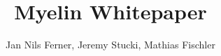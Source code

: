 \documentclass[a4paper]{article}
\title{Myelin Whitepaper}
\author{Jan Nils Ferner, Jeremy Stucki, Mathias Fischler}
\begin{document}
\maketitle
\thispagestyle{empty}

\clearpage

\twocolumn

\begin{abstract}
	
\end{abstract}

\clearpage

\onecolumn
\tableofcontents
\twocolumn

\clearpage






\clearpage

\nocite{*}


\end{document}
